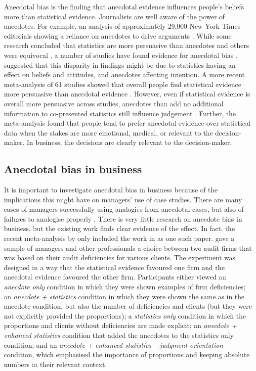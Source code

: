 \documentclass[a4paper, nobind, dvipsnames]{templates/ociamthesis}
\theoremstyle{definition}
\theoremstyle{definition}
\theoremstyle{definition}
\theoremstyle{definition}
\theoremstyle{remark}
\begin{document}
Anecdotal bias is the finding that anecdotal evidence influences people's
beliefs more than statistical evidence. Journalists are well aware of the power
of anecdotes. For example, an analysis of approximately 29,000 New York Times
editorials showing a reliance on anecdotes to drive arguments \autocite{alkhatib2017}.
While some research concluded that statistics are more persuasive than anecdotes
\autocites[e.g.,][]{allen1997,hornikx2005,hoeken2001} and others were equivocal
\autocite{winterbottom2008}, a number of studies have found evidence for anecdotal bias
\autocites[e.g.,][]{reinard1988,shen2015,jaramillo2019,ratcliff2020,reinhart2006}.
\textcite{zebregs2015} suggested that this disparity in findings might be due to
statistics having an effect on beliefs and attitudes, and anecdotes affecting
intention. A more recent meta-analysis of 61 studies showed that overall people
find statistical evidence more persuasive than anecdotal evidence
\autocite{freling2020}. However, even if statistical evidence is overall more persuasive
across studies, anecdotes than add no additional information to co-presented
statistics still influence judgement \autocite{jaramillo2019}. Further, the
meta-analysis found that people tend to prefer anecdotal evidence over
statistical data when the stakes are more emotional, medical, or relevant to the
decision-maker. In business, the decisions are clearly relevant to the
decision-maker.

\subsection{Anecdotal bias in business}

It is important to investigate anecdotal bias in business because of the
implications this might have on managers' use of case studies. There are many
cases of managers successfully using analogies from anecdotal cases, but also of
failures to analogise properly \autocite{gavetti2005,gavetti2005a}. There is very
little research on anecdote bias in business, but the existing work finds clear
evidence of the effect. In fact, the recent meta-analysis by \textcite{freling2020} only
included the work in \textcite{wainberg2013} as one such paper. \textcite{wainberg2013} gave a
sample of managers and other professionals a choice between two audit firms that
was based on their audit deficiencies for various clients. The experiment was
designed in a way that the statistical evidence favoured one firm and the
anecdotal evidence favoured the other firm. Participants either viewed an
\emph{anecdote only} condition in which they were shown examples of firm
deficiencies; an \emph{anecdote + statistics} condition in which they were shown the
same as in the anecdote condition, but also the number of deficiencies and
clients (but they were not explicitly provided the proportions); a \emph{statistics
only} condition in which the proportions and clients without deficiencies are
made explicit; an \emph{anecdote + enhanced statistics} condition that added the
anecdotes to the statistics only condition; and an \emph{anecdote + enhanced
statistics -- judgment orientation} condition, which emphasised the importance of
proportions and keeping absolute numbers in their relevant context.
\end{document}
